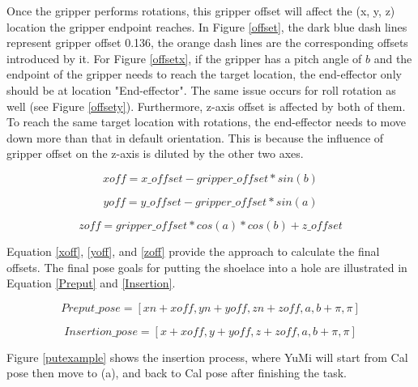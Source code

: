 Once the gripper performs rotations, this gripper offset will affect the (x, y, z) location the gripper endpoint reaches. In Figure \ref{offset}, the dark blue dash lines represent gripper offset 0.136, the orange dash lines are the corresponding offsets introduced by it. For Figure \ref{offsetx}, if the gripper has a pitch angle of $b$ and the endpoint of the gripper needs to reach the target location, the end-effector only should be at location "End-effector". The same issue occurs for roll rotation as well (see Figure \ref{offsety}). Furthermore, z-axis offset is affected by both of them. To reach the same target location with rotations, the end-effector needs to move down more than that in default orientation. This is because the influence of gripper offset on the z-axis is diluted by the other two axes.

\begin{equation}
xoff = x\_offset - gripper\_offset*sin(b)
\label{xoff}
\end{equation}

\begin{equation}
yoff = y\_offset - gripper\_offset*sin(a)
\label{yoff}
\end{equation}

\begin{equation}
zoff = gripper\_offset*cos(a)*cos(b) + z\_offset
\label{zoff}
\end{equation}

Equation \ref{xoff}, \ref{yoff}, and \ref{zoff} provide the approach to calculate the final offsets. The final pose goals for putting the shoelace into a hole are illustrated in Equation \ref{Preput} and \ref{Insertion}.

\begin{equation}
Preput\_pose = [xn + xoff, yn + yoff, zn + zoff, a, b + \pi, \pi]
\label{Preput}
\end{equation} 

\begin{equation}
Insertion\_pose = [x + xoff, y + yoff, z + zoff, a, b + \pi, \pi]
\label{Insertion}
\end{equation} 

Figure \ref{putexample} shows the insertion process, where YuMi will start from Cal pose then move to (a), and back to Cal pose after finishing the task.

